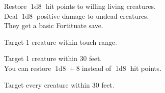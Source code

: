 




Restore \(\operatorname{1d8}\) hit points to willing living creatures.\\
Deal \(\operatorname{1d8}\) positive damage to undead creatures.\\
They get a basic Fortituate save.


Target 1 creature within touch range.


Target 1 creature within 30 feet.\\
You can restore \(\operatorname{1d8}+8\) instead of \(\operatorname{1d8}\) hit points.



Target every creature within 30 feet.
